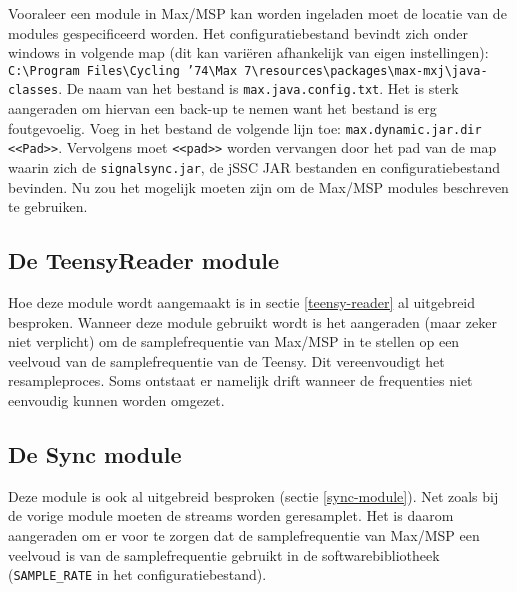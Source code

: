 Vooraleer een module in Max/MSP kan worden ingeladen moet de locatie van de modules gespecificeerd worden. Het configuratiebestand bevindt zich onder windows in volgende map (dit kan variëren afhankelijk van eigen instellingen): \texttt{C:\textbackslash Program Files\textbackslash Cycling '74\textbackslash Max 7\textbackslash resources\textbackslash packages\textbackslash max-mxj\textbackslash java-classes}. De naam van het bestand is \texttt{max.java.config.txt}. Het is sterk aangeraden om hiervan een back-up te nemen want het bestand is erg foutgevoelig. Voeg in het bestand de volgende lijn toe: \texttt{max.dynamic.jar.dir <<Pad>>}. Vervolgens moet \texttt{<<pad>>} worden vervangen door het pad van de map waarin zich de \texttt{signalsync.jar}, de jSSC JAR bestanden en configuratiebestand bevinden. Nu zou het mogelijk moeten zijn om de Max/MSP modules beschreven te gebruiken.

\subsection*{De TeensyReader module}

Hoe deze module wordt aangemaakt is in sectie \ref{teensy-reader} al uitgebreid besproken. Wanneer deze module gebruikt wordt is het aangeraden (maar zeker niet verplicht) om de samplefrequentie van Max/MSP in te stellen op een veelvoud van de samplefrequentie van de Teensy. Dit vereenvoudigt het resampleproces. Soms ontstaat er namelijk drift wanneer de frequenties niet eenvoudig kunnen worden omgezet.


\subsection*{De Sync module}

Deze module is ook al uitgebreid besproken (sectie \ref{sync-module}). Net zoals bij de vorige module moeten de streams worden geresamplet. Het is daarom aangeraden om er voor te zorgen dat de samplefrequentie van Max/MSP een veelvoud is van de samplefrequentie gebruikt in de softwarebibliotheek (\texttt{SAMPLE\_RATE} in het configuratiebestand).